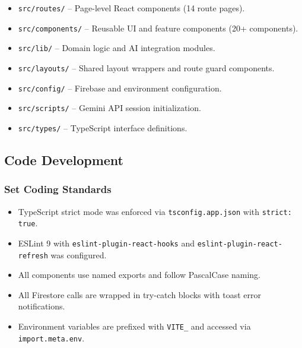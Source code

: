 \begin{itemize}
	\item \texttt{src/routes/} -- Page-level React components (14 route pages).
	\item \texttt{src/components/} -- Reusable UI and feature components (20+ components).
	\item \texttt{src/lib/} -- Domain logic and AI integration modules.
	\item \texttt{src/layouts/} -- Shared layout wrappers and route guard components.
	\item \texttt{src/config/} -- Firebase and environment configuration.
	\item \texttt{src/scripts/} -- Gemini API session initialization.
	\item \texttt{src/types/} -- TypeScript interface definitions.
\end{itemize}

\subsection{Code Development}
\subsubsection{Set Coding Standards}
\begin{itemize}
	\item TypeScript strict mode was enforced via \texttt{tsconfig.app.json} with \texttt{strict: true}.
	\item ESLint 9 with \texttt{eslint-plugin-react-hooks} and \texttt{eslint-plugin-react-refresh} was configured.
	\item All components use named exports and follow PascalCase naming.
	\item All Firestore calls are wrapped in try-catch blocks with toast error notifications.
	\item Environment variables are prefixed with \texttt{VITE\_} and accessed via \texttt{import.meta.env}.
\end{itemize}

